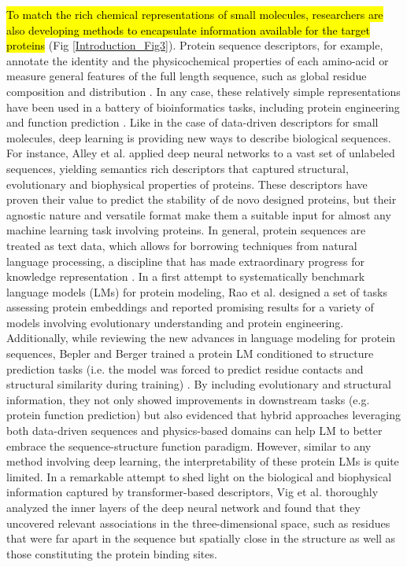 \hl{To match the rich chemical representations of small molecules, researchers are also developing methods to encapsulate information available for the target proteins} (Fig \ref{Introduction_Fig3}). Protein sequence descriptors, for example, annotate the identity and the physicochemical properties of each amino-acid \cite{hellberg_peptide_1987} or measure general features of the full length sequence, such as global residue composition and distribution \cite{xiao_protrprotrweb_2015}. In any case, these relatively simple representations have been used in a battery of bioinformatics tasks, including protein engineering \cite{xu_deep_2020} and function prediction \cite{kulmanov_deepgoplus_2020}. Like in the case of data-driven descriptors for small molecules, deep learning is providing new ways to describe biological sequences. For instance, Alley et al. \cite{alley_unified_2019} applied deep neural networks to a vast set of unlabeled sequences, yielding semantics rich descriptors that captured structural, evolutionary and biophysical properties of proteins. These descriptors have proven their value to predict the stability of de novo designed proteins, but their agnostic nature and versatile format make them a suitable input for almost any machine learning task involving proteins. In general, protein sequences are treated as text data, which allows for borrowing techniques from natural language processing, a discipline that has made extraordinary progress for knowledge representation \cite{asgari_continuous_2015, heinzinger_modeling_2019}. In a first attempt to systematically benchmark language models (LMs) for protein modeling, Rao et al. \cite{rao_evaluating_2019} designed a set of tasks assessing protein embeddings and reported promising results for a variety of models involving evolutionary understanding and protein engineering. Additionally, while reviewing the new advances in language modeling for protein sequences, Bepler and Berger \cite{bepler_learning_2019} trained a protein LM conditioned to structure prediction tasks (i.e. the model was forced to predict residue contacts and structural similarity during training) \cite{bepler_learning_2021}. By including evolutionary and structural information, they not only showed improvements in downstream tasks (e.g. protein function prediction) but also evidenced that hybrid approaches leveraging both data-driven sequences and physics-based domains can help LM to better embrace the sequence-structure function paradigm. However, similar to any method involving deep learning, the interpretability of these protein LMs is quite limited. In a remarkable attempt to shed light on the biological and biophysical information captured by transformer-based descriptors, Vig et al. \cite{vig_bertology_2020} thoroughly analyzed the inner layers of the deep neural network and found that they uncovered relevant associations in the three-dimensional space, such as residues that were far apart in the sequence but spatially close in the structure as well as those constituting the protein binding sites. 



